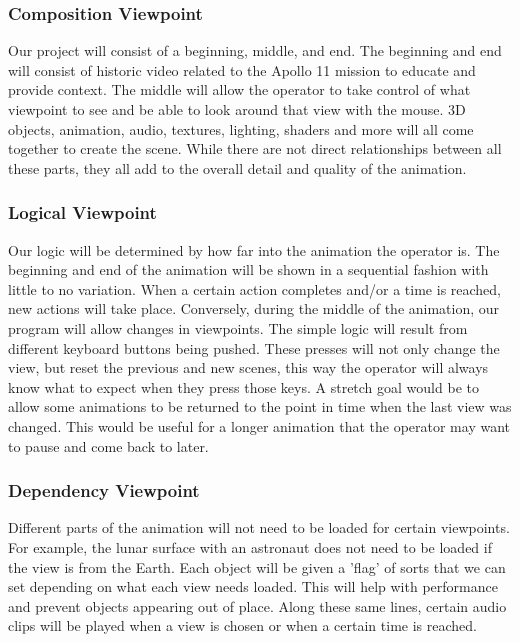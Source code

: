 \documentclass[onecolumn, draftclsnofoot,10pt, compsoc]{IEEEtran}
\begin{document}
    \subsubsection{Composition Viewpoint}
    
    Our project will consist of a beginning, middle, and end. The beginning and end will consist of historic video related to the Apollo 11 mission to educate and provide context. The middle will allow the operator to take control of what viewpoint to see and be able to look around that view with the mouse. 3D objects, animation, audio, textures, lighting, shaders and more will all come together to create the scene. While there are not direct relationships between all these parts, they all add to the overall detail and quality of the animation. 
    
    \subsubsection{Logical Viewpoint}

    Our logic will be determined by how far into the animation the operator is. The beginning and end of the animation will be shown in a sequential fashion with little to no variation. When a certain action completes and/or a time is reached, new actions will take place. Conversely, during the middle of the animation, our program will allow changes in viewpoints. The simple logic will result from different keyboard buttons being pushed. These presses will not only change the view, but reset the previous and new scenes, this way the operator will always know what to expect when they press those keys. A stretch goal would be to allow some animations to be returned to the point in time when the last view was changed. This would be useful for a longer animation that the operator may want to pause and come back to later. 
    
    \subsubsection{Dependency Viewpoint}

    Different parts of the animation will not need to be loaded for certain viewpoints. For example, the lunar surface with an astronaut does not need to be loaded if the view is from the Earth. Each object will be given a 'flag' of sorts that we can set depending on what each view needs loaded. This will help with performance and prevent objects appearing out of place. Along these same lines, certain audio clips will be played when a view is chosen or when a certain time is reached. 
    
\end{document}
